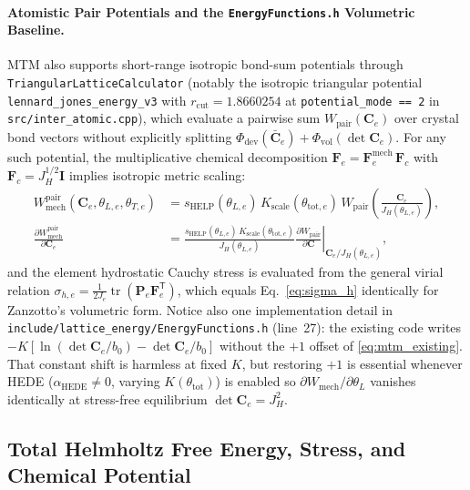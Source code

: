 \documentclass[11pt,a4paper]{article}
\newcommand{\T}{^{\mathsf T}}
\newcommand{\tr}{\operatorname{tr}}
\newcommand{\code}[1]{\texttt{#1}}
\begin{document}
\paragraph{Atomistic Pair Potentials and the \code{EnergyFunctions.h} Volumetric Baseline.}
MTM also supports short-range isotropic bond-sum potentials through \code{TriangularLatticeCalculator} (notably the isotropic triangular potential \code{lennard\_jones\_energy\_v3} with $r_{\text{cut}} = 1.8660254$ at \code{potential\_mode == 2} in \code{src/inter\_atomic.cpp}), which evaluate a pairwise sum $W_{\text{pair}}(\mathbf{C}_e)$ over crystal bond vectors without explicitly splitting $\Phi_{\text{dev}}(\bar{\mathbf{C}}_e) + \Phi_{\text{vol}}(\det\mathbf{C}_e)$. For any such potential, the multiplicative chemical decomposition $\mathbf{F}_e = \mathbf{F}_e^{\text{mech}}\,\mathbf{F}_c$ with $\mathbf{F}_c = J_H^{1/2}\mathbf{I}$ implies isotropic metric scaling:
\begin{align}
  W_{\text{mech}}^{\text{pair}}(\mathbf{C}_e, \theta_{L,e}, \theta_{T,e})
  &= s_{\text{HELP}}(\theta_{L,e})\, K_{\text{scale}}(\theta_{\text{tot},e})\, W_{\text{pair}}\!\left(\frac{\mathbf{C}_e}{J_H(\theta_{L,e})}\right), \nonumber \\
  \frac{\partial W_{\text{mech}}^{\text{pair}}}{\partial \mathbf{C}_e}
  &= \frac{s_{\text{HELP}}(\theta_{L,e})\, K_{\text{scale}}(\theta_{\text{tot},e})}{J_H(\theta_{L,e})}
    \left.\frac{\partial W_{\text{pair}}}{\partial \mathbf{C}}\right|_{\mathbf{C}_e/J_H(\theta_{L,e})},
  \label{eq:pair_swelling}
\end{align}
and the element hydrostatic Cauchy stress is evaluated from the general virial relation $\sigma_{h,e} = \frac{1}{2J_e}\tr(\mathbf{P}_e\mathbf{F}_e\T)$, which equals Eq.~\eqref{eq:sigma_h} identically for Zanzotto's volumetric form. Notice also one implementation detail in \code{include/lattice\_energy/EnergyFunctions.h} (line~27): the existing code writes $-K[\ln(\det\mathbf{C}_e/b_0) - \det\mathbf{C}_e/b_0]$ without the $+1$ offset of \eqref{eq:mtm_existing}. That constant shift is harmless at fixed $K$, but restoring $+1$ is essential whenever HEDE ($\alpha_{\text{HEDE}} \neq 0$, varying $K(\theta_{\text{tot}})$) is enabled so $\partial W_{\text{mech}}/\partial\theta_L$ vanishes identically at stress-free equilibrium $\det\mathbf{C}_e = J_H^2$.

\subsection{Total Helmholtz Free Energy, Stress, and Chemical Potential}
\end{document}

